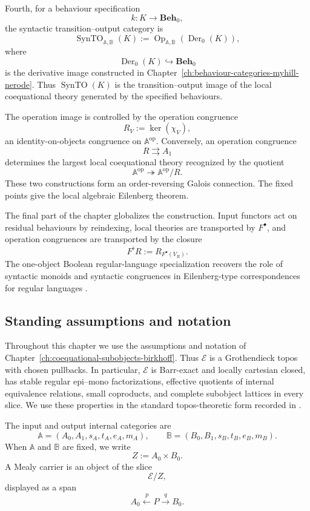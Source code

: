 Fourth, for a behaviour specification
\[
    k:K\to\mathbf{Beh}_0,
\]
the syntactic transition--output category is
\[
    \operatorname{SynTO}_{\mathbb A,\mathbb B}(K)
    :=
    \operatorname{Op}_{\mathbb A,\mathbb B}(\operatorname{Der}_0(K)),
\]
where
\[
    \operatorname{Der}_0(K)\hookrightarrow\mathbf{Beh}_0
\]
is the derivative image constructed in
Chapter~\ref{ch:behaviour-categories-myhill-nerode}. Thus
\(\operatorname{SynTO}(K)\) is the transition--output image of the local
coequational theory generated by the specified behaviours.

The operation image is controlled by the operation congruence
\[
    R_V:=\ker(\chi_V),
\]
an identity-on-objects congruence on \(\mathbb A^{\mathrm{op}}\). Conversely,
an operation congruence
\[
    R\rightrightarrows A_1
\]
determines the largest local coequational theory recognized by the quotient
\[
    \mathbb A^{\mathrm{op}}
    \twoheadrightarrow
    \mathbb A^{\mathrm{op}}/R.
\]
These two constructions form an order-reversing Galois connection. The fixed
points give the local algebraic Eilenberg theorem.

The final part of the chapter globalizes the construction. Input functors act
on residual behaviours by reindexing, local theories are transported by
\(F^\bullet\), and operation congruences are transported by the closure
\[
    F^\flat R:=R_{F^\bullet(V_R)}.
\]
The one-object Boolean regular-language specialization recovers the role of
syntactic monoids and syntactic congruences in Eilenberg-type correspondences
for regular languages
\cite{Eilenberg1974,AdamekMiliusMyersUrbat2019TOCL,Salamanca2017Unveiling}.

\subsection{Standing assumptions and notation}
\label{subsec:syntactic-to-standing-assumptions}

Throughout this chapter we use the assumptions and notation of
Chapter~\ref{ch:coequational-subobjects-birkhoff}. Thus \(\mathcal E\) is a
Grothendieck topos with chosen pullbacks. In particular, \(\mathcal E\) is
Barr-exact and locally cartesian closed, has stable regular epi--mono
factorizations, effective quotients of internal equivalence relations, small
coproducts, and complete subobject lattices in every slice. We use these
properties in the standard topos-theoretic form recorded in
\cite{Johnstone2002,Borceux1994,Jacobs1999CategoricalLogic}.

The input and output internal categories are
\[
    \mathbb A=(A_0,A_1,s_A,t_A,e_A,m_A),
    \qquad
    \mathbb B=(B_0,B_1,s_B,t_B,e_B,m_B).
\]
When \(\mathbb A\) and \(\mathbb B\) are fixed, we write
\[
    Z:=A_0\times B_0.
\]
A Mealy carrier is an object of the slice
\[
    \mathcal E/Z,
\]
displayed as a span
\[
    A_0\xleftarrow{p}P\xrightarrow{q}B_0.
\]

